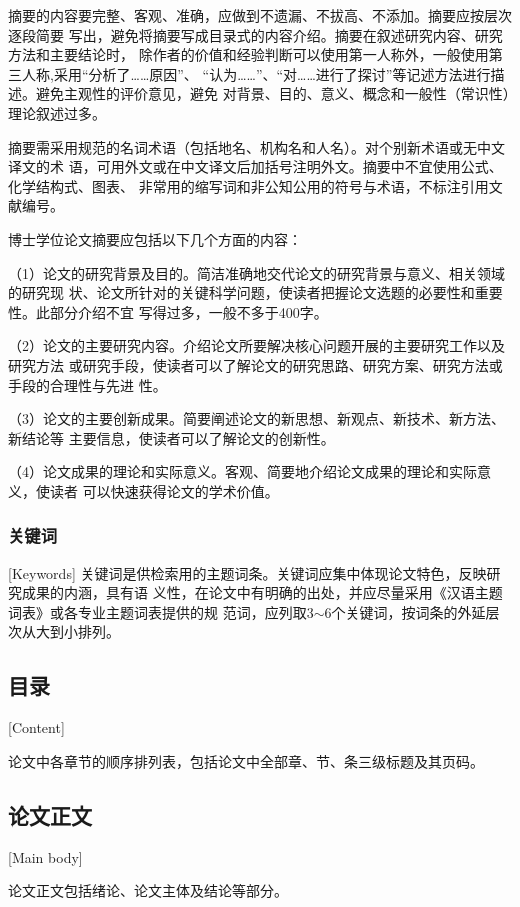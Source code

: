 摘要的内容要完整、客观、准确，应做到不遗漏、不拔高、不添加。摘要应按层次逐段简要
写出，避免将摘要写成目录式的内容介绍。摘要在叙述研究内容、研究方法和主要结论时，
除作者的价值和经验判断可以使用第一人称外，一般使用第三人称,采用“分析了……原因”、
“认为……”、“对……进行了探讨”等记述方法进行描述。避免主观性的评价意见，避免
对背景、目的、意义、概念和一般性（常识性）理论叙述过多。

摘要需采用规范的名词术语（包括地名、机构名和人名）。对个别新术语或无中文译文的术
语，可用外文或在中文译文后加括号注明外文。摘要中不宜使用公式、化学结构式、图表、
非常用的缩写词和非公知公用的符号与术语，不标注引用文献编号。

博士学位论文摘要应包括以下几个方面的内容：

（1）论文的研究背景及目的。简洁准确地交代论文的研究背景与意义、相关领域的研究现
状、论文所针对的关键科学问题，使读者把握论文选题的必要性和重要性。此部分介绍不宜
写得过多，一般不多于400字。

（2）论文的主要研究内容。介绍论文所要解决核心问题开展的主要研究工作以及研究方法
或研究手段，使读者可以了解论文的研究思路、研究方案、研究方法或手段的合理性与先进
性。

（3）论文的主要创新成果。简要阐述论文的新思想、新观点、新技术、新方法、新结论等
主要信息，使读者可以了解论文的创新性。

（4）论文成果的理论和实际意义。客观、简要地介绍论文成果的理论和实际意义，使读者
可以快速获得论文的学术价值。

\subsubsection{关键词}[Keywords]
关键词是供检索用的主题词条。关键词应集中体现论文特色，反映研究成果的内涵，具有语
义性，在论文中有明确的出处，并应尽量采用《汉语主题词表》或各专业主题词表提供的规
范词，应列取3$\sim$6个关键词，按词条的外延层次从大到小排列。

\subsection{目录}[Content]

论文中各章节的顺序排列表，包括论文中全部章、节、条三级标题及其页码。

\subsection{论文正文}[Main body]

论文正文包括绪论、论文主体及结论等部分。

